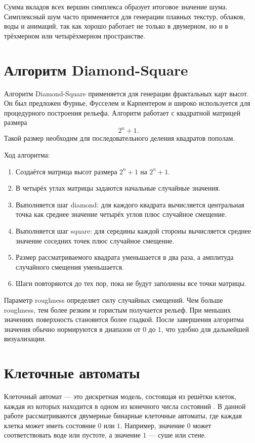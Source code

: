 Сумма вкладов всех вершин симплекса образует итоговое значение шума. Симплексный шум часто применяется для генерации плавных текстур, облаков, воды и анимаций, так как хорошо работает не только в двумерном, но и в трёхмерном или четырёхмерном пространстве.

\section{Алгоритм Diamond-Square}

Алгоритм Diamond-Square применяется для генерации фрактальных карт высот. Он был предложен Фурнье, Фусселем и Карпентером и широко используется для процедурного построения рельефа. Алгоритм работает с квадратной матрицей размера
\[
    2^n + 1.
\]
Такой размер необходим для последовательного деления квадратов пополам.

Ход алгоритма:
\begin{enumerate}
    \item Создаётся матрица высот размера $2^n+1$ на $2^n+1$.
    \item В четырёх углах матрицы задаются начальные случайные значения.
    \item Выполняется шаг diamond: для каждого квадрата вычисляется центральная точка как среднее значение четырёх углов плюс случайное смещение.
    \item Выполняется шаг square: для середины каждой стороны вычисляется среднее значение соседних точек плюс случайное смещение.
    \item Размер рассматриваемого квадрата уменьшается в два раза, а амплитуда случайного смещения уменьшается.
    \item Шаги повторяются до тех пор, пока не будут заполнены все точки матрицы.
\end{enumerate}

Параметр roughness определяет силу случайных смещений. Чем больше roughness, тем более резким и гористым получается рельеф. При меньших значениях поверхность становится более гладкой. После завершения алгоритма значения обычно нормируются в диапазон от $0$ до $1$, что удобно для дальнейшей визуализации.

\section{Клеточные автоматы}

Клеточный автомат --- это дискретная модель, состоящая из решётки клеток, каждая из которых находится в одном из конечного числа состояний \cite{cellular_habr,cellular_donntu}. В данной работе рассматриваются двумерные бинарные клеточные автоматы, где каждая клетка может иметь состояние $0$ или $1$. Например, значение $0$ может соответствовать воде или пустоте, а значение $1$ --- суше или стене.

